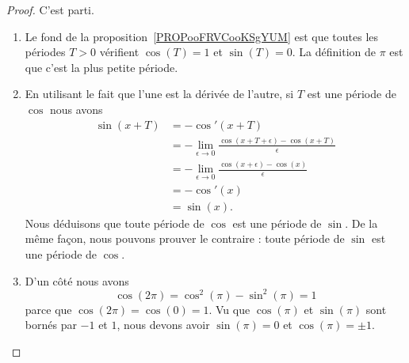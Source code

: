 \begin{proof}
    C'est parti.
    \begin{enumerate}
        \item
            Le fond de la proposition~\ref{PROPooFRVCooKSgYUM} est que toutes les périodes \( T>0\) vérifient \( \cos(T)=1\) et \( \sin(T)=0\). La définition de \( \pi\) est que c'est la plus petite période.
        \item
            En utilisant le fait que l'une est la dérivée de l'autre, si \( T\) est une période de \( \cos\) nous avons
            \begin{subequations}
                \begin{align}
                    \sin(x+T)&=-\cos'(x+T)\\
                    &=-\lim_{\epsilon\to 0}\frac{ \cos(x+T+\epsilon)-\cos(x+T) }{\epsilon  }\\
                    &=-\lim_{\epsilon\to 0}\frac{ \cos(x+\epsilon)-\cos(x) }{ \epsilon }\\
                    &=-\cos'(x)\\
                    &=\sin(x).
                \end{align}
            \end{subequations}
            Nous déduisons que toute période de \( \cos\) est une période de \( \sin\). De la même façon, nous pouvons prouver le contraire : toute période de \( \sin\) est une période de \( \cos\).
        \item
            D'un côté nous avons
            \begin{equation}
                \cos(2\pi)=\cos^2(\pi)-\sin^2(\pi)=1
            \end{equation}
            parce que \( \cos(2\pi)=\cos(0)=1\). Vu que \( \cos(\pi)\) et \( \sin(\pi)\) sont bornés par \( -1\) et \( 1\), nous devons avoir \( \sin(\pi)=0\) et \( \cos(\pi)=\pm 1\).


\end{enumerate}
\end{proof}
